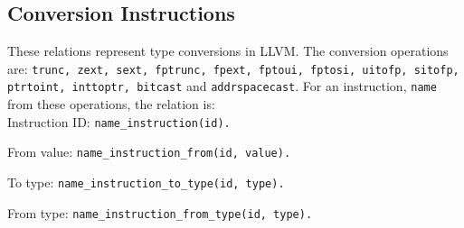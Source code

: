 \subsection{Conversion Instructions}
These relations represent type conversions in LLVM.
The conversion operations are: \texttt{trunc, zext, sext, fptrunc, fpext, fptoui, fptosi, uitofp,
sitofp, ptrtoint, inttoptr, bitcast} and \texttt{addrspacecast}.
For an instruction, \texttt{name} from these operations, the relation is:\\

\noindent Instruction ID:
\texttt{name\_instruction(id).}

\noindent From value:
\texttt{name\_instruction\_from(id, value).}

\noindent To type:
\texttt{name\_instruction\_to\_type(id, type).}

\noindent From type:
\texttt{name\_instruction\_from\_type(id, type).} 


